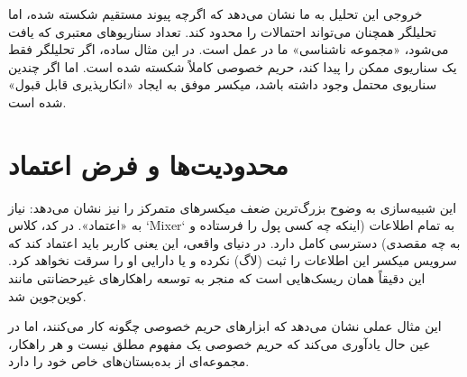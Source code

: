 خروجی این تحلیل به ما نشان می‌دهد که اگرچه پیوند مستقیم شکسته شده، اما تحلیلگر همچنان می‌تواند احتمالات را محدود کند. تعداد سناریوهای معتبری که یافت می‌شود، «مجموعه ناشناسی» ما در عمل است. در این مثال ساده، اگر تحلیلگر فقط یک سناریوی ممکن را پیدا کند، حریم خصوصی کاملاً شکسته شده است. اما اگر چندین سناریوی محتمل وجود داشته باشد، میکسر موفق به ایجاد «انکارپذیری قابل قبول» شده است.

\section{محدودیت‌ها و فرض اعتماد}

این شبیه‌سازی به وضوح بزرگ‌ترین ضعف میکسرهای متمرکز را نیز نشان می‌دهد: نیاز به «اعتماد». در کد، کلاس `Mixer` به تمام اطلاعات (اینکه چه کسی پول را فرستاده و به چه مقصدی) دسترسی کامل دارد. در دنیای واقعی، این یعنی کاربر باید اعتماد کند که سرویس میکسر این اطلاعات را ثبت (لاگ) نکرده و یا دارایی او را سرقت نخواهد کرد. این دقیقاً همان ریسک‌هایی است که منجر به توسعه راهکارهای غیرحضانتی مانند کوین‌جوین شد.

این مثال عملی نشان می‌دهد که ابزارهای حریم خصوصی چگونه کار می‌کنند، اما در عین حال یادآوری می‌کند که حریم خصوصی یک مفهوم مطلق نیست و هر راهکار، مجموعه‌ای از بده‌بستان‌های خاص خود را دارد.